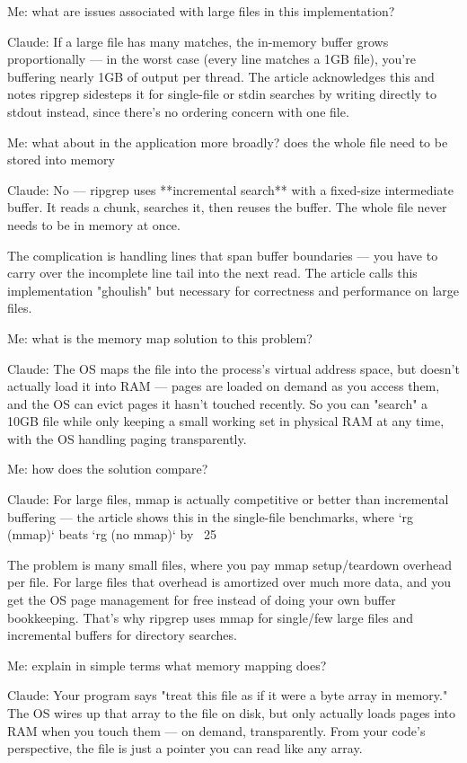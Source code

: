 \documentclass[letterpaper,twocolumn,10pt]{article}
\begin{document}
Me: what are issues associated with large files in this implementation?

Claude: If a large file has many matches, the in-memory buffer grows proportionally --- in the worst case (every line matches a 1GB file), you're buffering nearly 1GB of output per thread. The article acknowledges this and notes ripgrep sidesteps it for single-file or stdin searches by writing directly to stdout instead, since there's no ordering concern with one file.

Me: what about in the application more broadly? does the whole file need to be stored into memory

Claude: No --- ripgrep uses **incremental search** with a fixed-size intermediate buffer. It reads a chunk, searches it, then reuses the buffer. The whole file never needs to be in memory at once.

The complication is handling lines that span buffer boundaries --- you have to carry over the incomplete line tail into the next read. The article calls this implementation "ghoulish" but necessary for correctness and performance on large files.

Me: what is the memory map solution to this problem?

Claude: The OS maps the file into the process's virtual address space, but doesn't actually load it into RAM --- pages are loaded on demand as you access them, and the OS can evict pages it hasn't touched recently. So you can "search" a 10GB file while only keeping a small working set in physical RAM at any time, with the OS handling paging transparently.

Me: how does the solution compare?

Claude: For large files, mmap is actually competitive or better than incremental buffering --- the article shows this in the single-file benchmarks, where `rg (mmap)` beats `rg (no mmap)` by ~25%

The problem is many small files, where you pay mmap setup/teardown overhead per file. For large files that overhead is amortized over much more data, and you get the OS page management for free instead of doing your own buffer bookkeeping. That's why ripgrep uses mmap for single/few large files and incremental buffers for directory searches.

Me: explain in simple terms what memory mapping does?

Claude: Your program says "treat this file as if it were a byte array in memory." The OS wires up that array to the file on disk, but only actually loads pages into RAM when you touch them --- on demand, transparently. From your code's perspective, the file is just a pointer you can read like any array.
\end{document}

